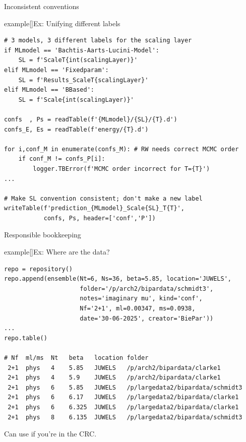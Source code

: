 \begin{frame}[fragile]{Inconsistent conventions}
\begin{varblock}{example}[\textwidth]{Ex: Unifying different labels}
\begin{lstlisting}[style=mypython]
# 3 models, 3 different labels for the scaling layer
if MLmodel == 'Bachtis-Aarts-Lucini-Model':
    SL = f'ScaleT{int(scalingLayer)}'
elif MLmodel == 'Fixedparam':
    SL = f'Results_ScaleT{scalingLayer}'
elif MLmodel == 'BBased':
    SL = f'Scale{int(scalingLayer)}'

confs  , Ps = readTable(f'{MLmodel}/{SL}/{T}.d')
confs_E, Es = readTable(f'energy/{T}.d')

for i,conf_M in enumerate(confs_M): # RW needs correct MCMC order
    if conf_M != confs_P[i]:
        logger.TBError(f'MCMC order incorrect for T={T}')
...

# Make SL convention consistent; don't make a new label
writeTable(f'prediction_{MLmodel}_Scale{SL}_T{T}',
           confs, Ps, header=['conf','P'])
\end{lstlisting}
\end{varblock}
\end{frame}


\begin{frame}[fragile]{Responsible bookkeeping}
\begin{varblock}{example}[\textwidth]{Ex: Where are the data?}
\begin{lstlisting}[style=mypython]
repo = repository()
repo.append(ensemble(Nt=6, Ns=36, beta=5.85, location='JUWELS',
                     folder='/p/arch2/bipardata/schmidt3',
                     notes='imaginary mu', kind='conf',
                     Nf='2+1', ml=0.00347, ms=0.0938,
                     date='30-06-2025', creator='BiePar'))
...
repo.table()

# Nf  ml/ms  Nt   beta   location folder
 2+1  phys   4    5.85   JUWELS   /p/arch2/bipardata/clarke1
 2+1  phys   4    5.9    JUWELS   /p/arch2/bipardata/clarke1
 2+1  phys   6    5.85   JUWELS   /p/largedata2/bipardata/schmidt3
 2+1  phys   6    6.17   JUWELS   /p/largedata2/bipardata/clarke1
 2+1  phys   6    6.325  JUWELS   /p/largedata2/bipardata/clarke1
 2+1  phys   8    6.135  JUWELS   /p/largedata2/bipardata/schmidt3
\end{lstlisting}
\vspace{3mm}

\centering
Can use  if you're in the CRC.
\end{varblock}
\end{frame}


